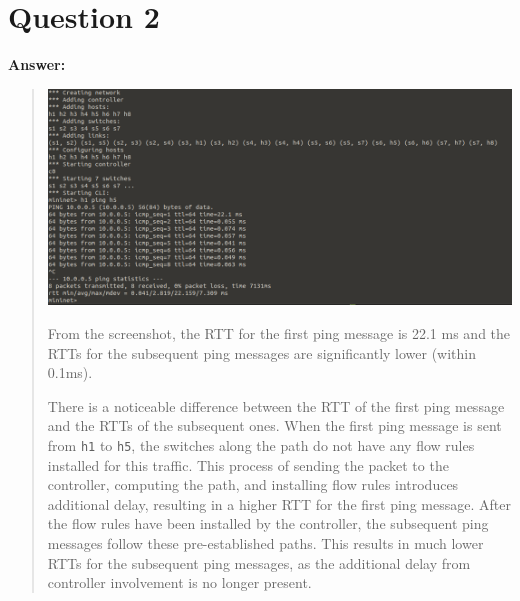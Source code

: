 \documentclass{article}
\begin{document}
\section*{Question 2}
\textbf{Answer:}
\begin{quote}
    \begin{center}
        \includegraphics[scale=0.5]{screenshot/ping.png}
    \end{center}

    From the screenshot, the RTT for the first ping message is 22.1 ms and the RTTs for the subsequent ping messages are significantly lower (within 0.1ms).

    There is a noticeable difference between the RTT of the first ping message and the RTTs of the subsequent ones. When the first ping message is sent from \texttt{h1} to \texttt{h5}, the switches along the path do not have any flow rules installed for this traffic. This process of sending the packet to the controller, computing the path, and installing flow rules introduces additional delay, resulting in a higher RTT for the first ping message. After the flow rules have been installed by the controller, the subsequent ping messages follow these pre-established paths. This results in much lower RTTs for the subsequent ping messages, as the additional delay from controller involvement is no longer present.
\end{quote}
\newpage
\end{document}
